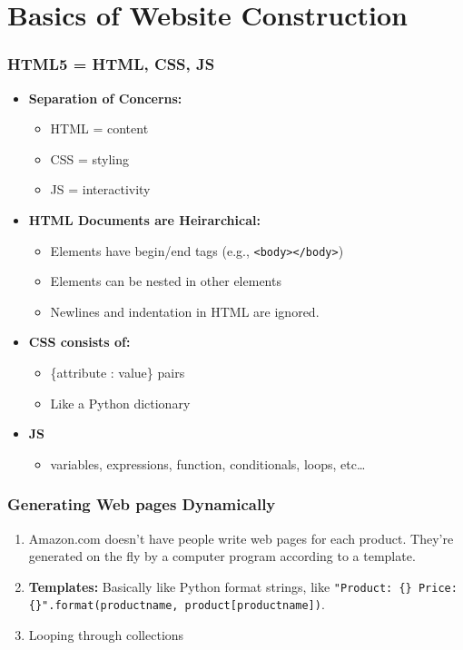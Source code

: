 \documentclass{beamer}
\begin{document}
\section{Basics of Website Construction}
%
%
\begin{frame}[fragile]
    \frametitle{HTML5 = HTML, CSS, JS}
    \pause
    \begin{itemize}
        \item \textbf{Separation of Concerns: }
            \begin{itemize}
                \item HTML = content
                \item CSS = styling
                \item JS = interactivity
            \end{itemize}
            \pause
        \item \textbf{HTML Documents are Heirarchical: }
            \begin{itemize}
                \item Elements have begin/end tags (e.g., \lstinline|<body></body>|)
                \item Elements can be nested in other elements
                \item Newlines and indentation in HTML are ignored.
            \end{itemize}
            \pause
        \item \textbf{CSS consists of:}
            \begin{itemize}
                \item \{attribute : value\} pairs
                \item Like a Python dictionary
            \end{itemize}
            \pause
        \item \textbf{JS}
            \begin{itemize}
                \item variables, expressions, function, conditionals, loops, etc\ldots
            \end{itemize}
    \end{itemize}
\end{frame}
%
%
\begin{frame}[fragile]
    \frametitle{Generating Web pages Dynamically}
    \begin{enumerate}[A]
        \item Amazon.com doesn't have people write web pages for each product. They're generated on the fly by a computer program according to a template.
        \item \textbf{Templates: } Basically like Python format strings, like \lstinline|"Product: {} Price: {}".format(productname, product[productname])|.
        \item Looping through collections
    \end{enumerate}
\end{frame}
\end{document}
